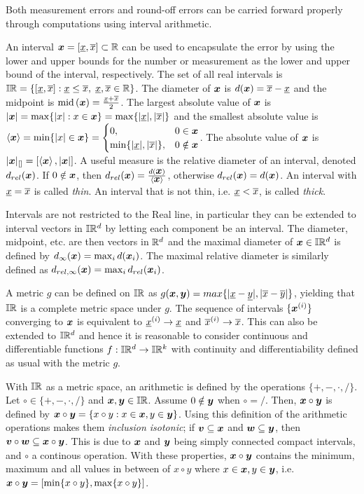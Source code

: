 \documentclass[../rigorous-computation.tex]{subfile}
\begin{document}
  Both measurement errors and round-off errors can be carried forward properly through computations using interval arithmetic.

  An interval $\x = [\ul x, \ol x] \subset \Rz$ can be used to encapsulate the error by using the lower and upper bounds for the number or measurement as the lower and upper bound of the interval, respectively.
  The set of all real intervals is $\mathbb{I} \mathbb{R} = \{[\underline x, \overline x] : \underline x \le \overline x,\; \underline x, \overline x \in \mathbb{R} \}$.
  The diameter of $\x$ is $d(\x) = \ol x - \ul x$ and the midpoint is $\Imid(\x) = \frac{\ul x + \ol x}{2}$.
  The largest absolute value of $\x$ is 
  $|\x| = \max \{ |x| : x \in \x \} = \max \{ |\ul x|, |\ol x| \}$ and 
  the smallest absolute value is \linebreak 
  $\left< \x \right> = \min \{ |x| \in \x \} = \begin{cases} 0,& 0 \in \x \\ \min \{ |\ul x|, |\ol x| \},& 0 \notin \x \end{cases}$.
  The absolute value of $\x$ is $|\x|_{[]} = [\left< \x \right>, |\x|]$.
  A useful measure is the relative diameter of an interval, denoted $d_{rel}(\x)$.
  If $0 \notin \x$, then $\drel(\x) = \frac{d(\x)}{\left< \x \right>}$, 
  otherwise $\drel(\x) = d(\x)$.
  An interval with $\underline x = \overline x$ is called \textit{thin}.
  An interval that is not thin, i.e. $\underline x < \overline x$, is called \textit{thick}.

  Intervals are not restricted to the Real line, 
  in particular they can be extended to interval vectors in $\mathbb{I}\mathbb{R}^d$ by 
  letting each component be an interval.
  The diameter, midpoint, etc. are then vectors in $\mathbb{R}^d$ and 
  the maximal diameter of $\x \in \Iz \Rz^d$ is defined by $\dm(\x) = \max_i d(\x_i)$.
  The maximal relative diameter is similarly defined as $\dmrel(\x) = \max_i \drel(\x_i)$.

  A metric $g$ can be defined on $\mathbb{I} \mathbb{R}$ as 
  $g(\x,\y) = max\{|\ul x - \ul y|, |\ol x - \ol y|\}$, 
  yielding that $\mathbb{I} \mathbb{R}$ is a complete metric space under $g$.
  The sequence of intervals $\{\x^{(i)}\}$ converging to $\x$ is 
  equivalent to $\underline x^{(i)} \to \underline x$ and $\overline x^{(i)} \to \overline x$.
  This can also be extended to $\mathbb{I} \mathbb{R}^d$ and 
  hence it is reasonable to consider continuous and differentiable functions 
  $f : \mathbb{I} \mathbb{R}^d \to \mathbb{I} \mathbb{R}^k$ with continuity and differentiability 
  defined as usual with the metric $g$.

  With $\mathbb{I} \mathbb{R}$ as a metric space, an arithmetic is defined by 
  the operations $\{+,-,\cdot,/\}$.
  Let $\circ \in \{+,-,\cdot,/\}$ and $\x, \y \in \Iz \Rz$.
  Assume $0 \notin \y$ when $\circ = /$.
  Then, $\x \circ \y$ is defined by 
  $\x \circ \y = \{ x \circ y : x \in \x, y \in \y \}$.
  Using this definition of the arithmetic operations makes them \textit{inclusion isotonic}; 
  if $\vv \subseteq \x$ and $\w \subseteq \y$, then $\vv \circ \w \subseteq \x \circ \y$.
  This is due to $\x$ and $\y$ being simply connected compact intervals, 
  and $\circ$ a continous operation.
  With these properties, $\x \circ \y$ contains the minimum, maximum and 
  all values in between of $x \circ y$ where $x \in \x, y \in \y$, 
  i.e. $\x \circ \y = [\min\{ x \circ y \}, \max\{ x \circ y \}]$.
\end{document}

